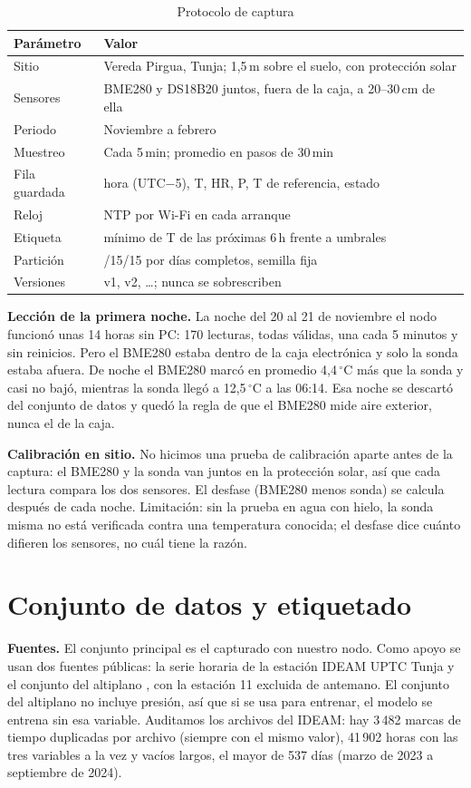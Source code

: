 \documentclass[conference]{IEEEtran}
\begin{document}
\begin{table}[t]
\caption{Protocolo de captura}
\label{tab:protocolo}
\centering
\begin{tabular}{@{}>{\raggedright}p{2.2cm}>{\raggedright\arraybackslash}p{5.6cm}@{}}
\toprule
Par\'ametro & Valor \\
\midrule
Sitio & Vereda Pirgua, Tunja; 1,5\,m sobre el suelo, con protecci\'on solar \\
Sensores & BME280 y DS18B20 juntos, fuera de la caja, a 20--30\,cm de ella \\
Periodo & Noviembre a febrero \\
Muestreo & Cada 5\,min; promedio en pasos de 30\,min \\
Fila guardada & hora (UTC$-$5), T, HR, P, T de referencia, estado \\
Reloj & NTP por Wi-Fi en cada arranque \\
Etiqueta & m\'inimo de T de las pr\'oximas 6\,h frente a umbrales \\
Partici\'on & 70/15/15 por d\'ias completos, semilla fija \\
Versiones & v1, v2, \dots; nunca se sobrescriben \\
\bottomrule
\end{tabular}
\end{table}

\textbf{Lecci\'on de la primera noche.} La noche del 20 al 21 de noviembre el nodo funcion\'o unas 14 horas sin PC: 170 lecturas, todas v\'alidas, una cada 5 minutos y sin reinicios. Pero el BME280 estaba dentro de la caja electr\'onica y solo la sonda estaba afuera. De noche el BME280 marc\'o en promedio 4,4\,$^\circ$C m\'as que la sonda y casi no baj\'o, mientras la sonda lleg\'o a 12,5\,$^\circ$C a las 06:14. Esa noche se descart\'o del conjunto de datos y qued\'o la regla de que el BME280 mide aire exterior, nunca el de la caja.

\textbf{Calibraci\'on en sitio.} No hicimos una prueba de calibraci\'on aparte antes de la captura: el BME280 y la sonda van juntos en la protecci\'on solar, as\'i que cada lectura compara los dos sensores. El desfase (BME280 menos sonda) se calcula despu\'es de cada noche. Limitaci\'on: sin la prueba en agua con hielo, la sonda misma no est\'a verificada contra una temperatura conocida; el desfase dice cu\'anto difieren los sensores, no cu\'al tiene la raz\'on.

\section{Conjunto de datos y etiquetado}
\textbf{Fuentes.} El conjunto principal es el capturado con nuestro nodo. Como apoyo se usan dos fuentes p\'ublicas: la serie horaria de la estaci\'on IDEAM UPTC Tunja \cite{ideam_data} y el conjunto del altiplano \cite{zenodo2026}, con la estaci\'on 11 excluida de antemano. El conjunto del altiplano no incluye presi\'on, as\'i que si se usa para entrenar, el modelo se entrena sin esa variable. Auditamos los archivos del IDEAM: hay 3\,482 marcas de tiempo duplicadas por archivo (siempre con el mismo valor), 41\,902 horas con las tres variables a la vez y vac\'ios largos, el mayor de 537 d\'ias (marzo de 2023 a septiembre de 2024).
\end{document}
